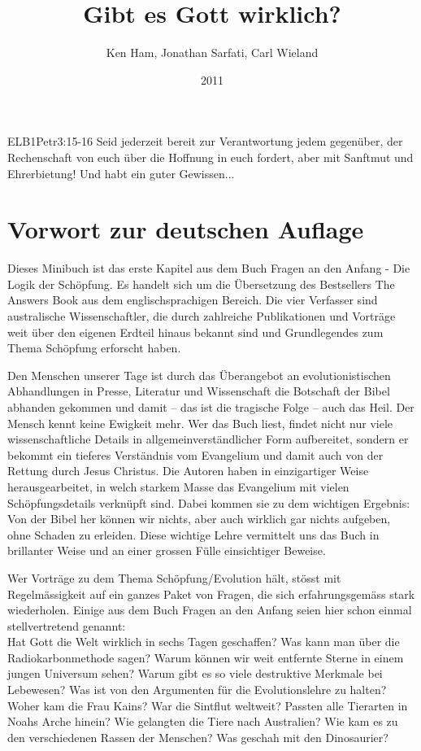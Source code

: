 \documentclass{../inc/mybibbook}
\title{Gibt es Gott wirklich?}
\author{Ken Ham, Jonathan Sarfati, Carl Wieland}
\date{2011}
\begin{document}
\maketitle
\begin{bibeltext}{ELB}{1Petr}{3:15-16}
    Seid jederzeit bereit zur Verantwortung jedem gegenüber, der Rechenschaft von euch über die Hoffnung in euch fordert, aber mit Sanftmut und Ehrerbietung! Und habt ein guter Gewissen...
\end{bibeltext}
\tableofcontents
\section{Vorwort zur deutschen Auflage}
Dieses Minibuch \cite{keith1} ist das erste Kapitel aus dem Buch \flqq Fragen an den Anfang - Die Logik der Schöpfung\frqq. Es handelt sich um die Übersetzung des Bestsellers \flqq The Answers Book\frqq{} aus dem englischsprachigen Bereich. Die vier Verfasser sind australische Wissenschaftler, die durch zahlreiche Publikationen und Vorträge weit über den eigenen Erdteil hinaus bekannt sind und Grundlegendes zum Thema Schöpfung erforscht haben.

Den Menschen unserer Tage ist durch das Überangebot an evolutionistischen Abhandlungen in Presse, Literatur und Wissenschaft die Botschaft der Bibel abhanden gekommen und damit -- das ist die tragische Folge -- auch das Heil. Der Mensch kennt keine Ewigkeit mehr. Wer das Buch liest, findet nicht nur viele wissenschaftliche Details in allgemeinverständlicher Form aufbereitet, sondern er bekommt ein tieferes Verständnis vom Evangelium und damit auch von der Rettung durch Jesus Christus. Die Autoren haben in einzigartiger Weise herausgearbeitet, in welch starkem Masse das Evangelium mit vielen Schöpfungsdetails verknüpft sind. Dabei kommen sie zu dem wichtigen Ergebnis: Von der Bibel her können wir nichts, aber auch wirklich gar nichts aufgeben, ohne Schaden zu erleiden. Diese wichtige Lehre vermittelt uns das Buch in brillanter Weise und an einer grossen Fülle einsichtiger Beweise.

Wer Vorträge zu dem Thema Schöpfung/Evolution hält, stösst mit Regelmässigkeit auf ein ganzes Paket von Fragen, die sich erfahrungsgemäss stark wiederholen. Einige aus dem Buch \flqq Fragen an den Anfang\frqq{} seien hier schon einmal stellvertretend genannt:\\
Hat Gott die Welt wirklich in sechs Tagen geschaffen? Was kann man über die Radiokarbonmethode sagen? Warum können wir weit entfernte Sterne in einem jungen Universum sehen? Warum gibt es so viele destruktive Merkmale bei Lebewesen? Was ist von den Argumenten für die Evolutionslehre zu halten? Woher kam die Frau Kains? War die Sintflut weltweit? Passten alle Tierarten in Noahs Arche hinein? Wie gelangten die Tiere nach Australien? Wie kam es zu den verschiedenen Rassen der Menschen? Was geschah mit den Dinosaurier?
\end{document}
